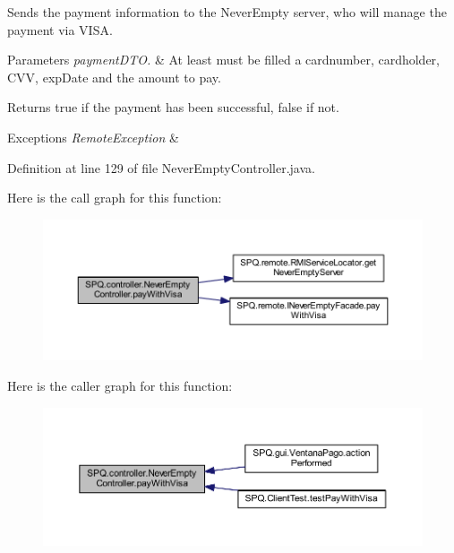 Sends the payment information to the Never\+Empty server, who will manage the payment via V\+I\+SA. 
\begin{DoxyParams}{Parameters}
{\em payment\+D\+T\+O.} & At least must be filled a cardnumber, cardholder, C\+VV, exp\+Date and the amount to pay. \\
\hline
\end{DoxyParams}
\begin{DoxyReturn}{Returns}
true if the payment has been successful, false if not. 
\end{DoxyReturn}

\begin{DoxyExceptions}{Exceptions}
{\em Remote\+Exception} & \\
\hline
\end{DoxyExceptions}


Definition at line 129 of file Never\+Empty\+Controller.\+java.

Here is the call graph for this function\+:
\nopagebreak
\begin{figure}[H]
\begin{center}
\leavevmode
\includegraphics[width=350pt]{class_s_p_q_1_1controller_1_1_never_empty_controller_a79b4d6042b76ad3aee7f11d104d813d6_cgraph}
\end{center}
\end{figure}
Here is the caller graph for this function\+:
\nopagebreak
\begin{figure}[H]
\begin{center}
\leavevmode
\includegraphics[width=350pt]{class_s_p_q_1_1controller_1_1_never_empty_controller_a79b4d6042b76ad3aee7f11d104d813d6_icgraph}
\end{center}
\end{figure}
\mbox{\label{class_s_p_q_1_1controller_1_1_never_empty_controller_ad766d360d5d5c69d6e6d5b2953b27fac}} 
